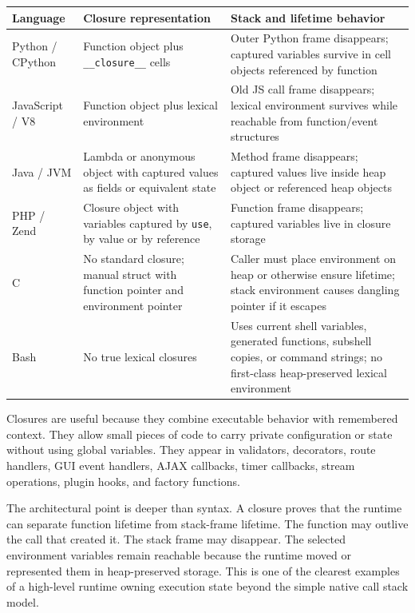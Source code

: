\begin{center}
\begin{tabular}{|p{}|p{}|p{}|}
\hline
\textbf{Language} & \textbf{Closure representation} & \textbf{Stack and lifetime behavior} \\
\hline
Python / CPython & Function object plus \texttt{\_\_closure\_\_} cells & Outer Python frame disappears; captured variables survive in cell objects referenced by function \\
\hline
JavaScript / V8 & Function object plus lexical environment & Old JS call frame disappears; lexical environment survives while reachable from function/event structures \\
\hline
Java / JVM & Lambda or anonymous object with captured values as fields or equivalent state & Method frame disappears; captured values live inside heap object or referenced heap objects \\
\hline
PHP / Zend & Closure object with variables captured by \texttt{use}, by value or by reference & Function frame disappears; captured variables live in closure storage \\
\hline
C & No standard closure; manual struct with function pointer and environment pointer & Caller must place environment on heap or otherwise ensure lifetime; stack environment causes dangling pointer if it escapes \\
\hline
Bash & No true lexical closures & Uses current shell variables, generated functions, subshell copies, or command strings; no first-class heap-preserved lexical environment \\
\hline
\end{tabular}
\end{center}

Closures are useful because they combine executable behavior with remembered context. They allow small pieces of code to carry private configuration or state without using global variables. They appear in validators, decorators, route handlers, GUI event handlers, AJAX callbacks, timer callbacks, stream operations, plugin hooks, and factory functions.

The architectural point is deeper than syntax. A closure proves that the runtime can separate function lifetime from stack-frame lifetime. The function may outlive the call that created it. The stack frame may disappear. The selected environment variables remain reachable because the runtime moved or represented them in heap-preserved storage. This is one of the clearest examples of a high-level runtime owning execution state beyond the simple native call stack model.


